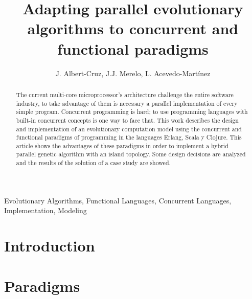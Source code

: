 \documentclass[runningheads]{llncs}
\newcommand{\keywords}[1]{\par\addvspace\baselineskip
\noindent\keywordname\enspace\ignorespaces#1}
\begin{document}
\mainmatter  %

\title{Adapting parallel evolutionary algorithms to concurrent and functional paradigms}

\author{J. Albert-Cruz, J.J. Merelo, L. Acevedo-Martínez}





\maketitle

\begin{abstract}
The current multi-core microprocessor's architecture challenge the entire software industry, to take advantage of them is necessary a parallel implementation of every simple program. Concurrent programming is hard; to use programming languages with built-in concurrent concepts is one way to face that. This work describes the design and implementation of an evolutionary computation model using the concurrent and functional paradigms of programming in the languages Erlang, Scala y Clojure. This article shows the advantages of these paradigms in order to implement a hybrid parallel genetic algorithm with an island topology. Some design decisions are analyzed and the results of the solution of a case study are showed.
\end{abstract}

\keywords{Evolutionary Algorithms, Functional Languages, Concurrent Languages, Implementation, Modeling}


\section{Introduction}
\label{sec:intro}
    

\section{Paradigms}
\label{sec:paradigmas}
    
\end{document}
